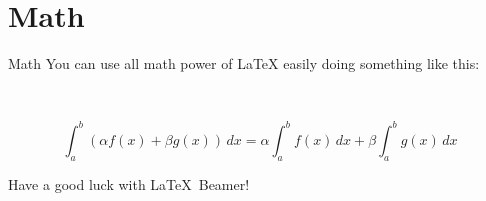 \documentclass{beamer}
\begin{document}
\section{Math}

\begin{frame}{Math}
	You can use all math power of LaTeX easily doing something like this:
	\newline
	\centerline\
	$$\int_{a}^{b}( \alpha f(x) + \beta g(x))\,dx = \alpha \int_{a}^{b}f(x)\,dx + \beta \int_{a}^{b}g(x)\,dx$$
\end{frame}

\begin{frame}{}
		\LARGE{\centerline{Have a good luck with  \LaTeX\ Beamer!}}
\end{frame}
\end{document}
